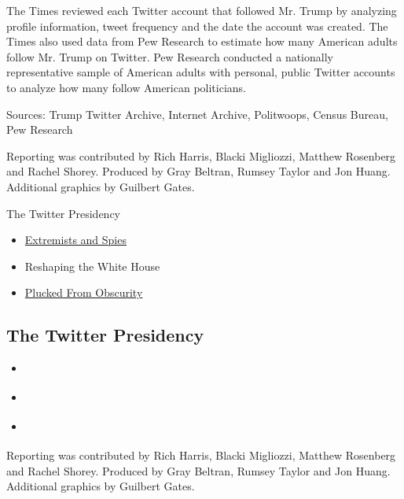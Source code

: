 The Times reviewed each Twitter account that followed Mr. Trump by
analyzing profile information, tweet frequency and the date the account
was created. The Times also used data from Pew Research to estimate how
many American adults follow Mr. Trump on Twitter. Pew Research conducted
a nationally representative sample of American adults with personal,
public Twitter accounts to analyze how many follow American politicians.

Sources: Trump Twitter Archive, Internet Archive, Politwoops, Census
Bureau, Pew Research

Reporting was contributed by Rich Harris, Blacki Migliozzi, Matthew
Rosenberg and Rachel Shorey. Produced by Gray Beltran, Rumsey Taylor and
Jon Huang. Additional graphics by Guilbert Gates.

The Twitter Presidency

\begin{itemize}
\tightlist
\item
  \href{https://www.nytimes.com/interactive/2019/11/02/us/politics/trump-twitter-disinformation.html\%0A}{Extremists
  and Spies}
\item
  Reshaping the White House
\item
  \href{https://www.nytimes.com/interactive/2019/11/02/us/politics/trump-twitter-retweets.html\%0A}{Plucked
  From Obscurity}
\end{itemize}

\hypertarget{the-twitter-presidency}{%
\subsection{The Twitter Presidency}\label{the-twitter-presidency}}

\begin{itemize}
\tightlist
\item
  \href{https://www.nytimes.com/interactive/2019/11/02/us/politics/trump-twitter-disinformation.html\%0A}{}
\item
  \href{https://www.nytimes.com/interactive/2019/11/02/us/politics/trump-twitter-retweets.html\%0A}{}
\item
  \href{https://www.nytimes.com/2019/11/02/us/trump-twitter-takeaways.html}{}
\end{itemize}

Reporting was contributed by Rich Harris, Blacki Migliozzi, Matthew
Rosenberg and Rachel Shorey. Produced by Gray Beltran, Rumsey Taylor and
Jon Huang. Additional graphics by Guilbert Gates.

